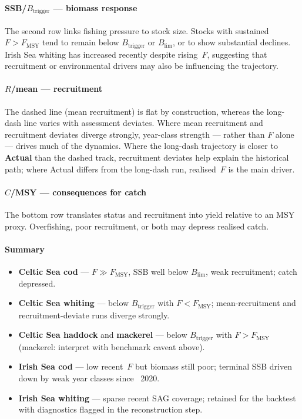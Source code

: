 \documentclass[11pt,a4paper]{extarticle}
\begin{document}
\paragraph{SSB/\(B_{\mathrm{trigger}}\) --- biomass response}
The second row links fishing pressure to stock size. Stocks with sustained
\(F > F_{\mathrm{MSY}}\) tend to remain below \(B_{\mathrm{trigger}}\) or
\(B_{\lim}\), or to show substantial declines. Irish Sea whiting has increased
recently despite rising~\(F\), suggesting that recruitment or environmental
drivers may also be influencing the trajectory.

\paragraph{\(R\)/mean --- recruitment}
The dashed line (mean recruitment) is flat by construction, whereas the long-dash line varies with assessment deviates. Where mean recruitment and recruitment deviates diverge strongly, year-class strength --- rather than \(F\) alone --- drives much of the dynamics. Where the long-dash trajectory is closer to \textbf{Actual} than the dashed track, recruitment deviates help explain the historical path; where Actual differs from the long-dash run,
realised~\(F\) is the main driver.

\paragraph{\(C\)/MSY --- consequences for catch}
The bottom row translates status and recruitment into yield relative to an MSY proxy. Overfishing, poor recruitment, or both may depress realised catch.

\paragraph{Summary}
\begin{itemize}
  \item \textbf{Celtic Sea cod} --- \(F \gg F_{\mathrm{MSY}}\), SSB well below
        \(B_{\lim}\), weak recruitment; catch depressed.
  \item \textbf{Celtic Sea whiting} --- below \(B_{\mathrm{trigger}}\) with
        \(F < F_{\mathrm{MSY}}\); mean-recruitment and recruitment-deviate
        runs diverge strongly.
  \item \textbf{Celtic Sea haddock} and \textbf{mackerel} --- below
        \(B_{\mathrm{trigger}}\) with \(F > F_{\mathrm{MSY}}\) (mackerel:
        interpret with benchmark caveat above).
  \item \textbf{Irish Sea cod} --- low recent~\(F\) but biomass still poor;
        terminal SSB driven down by weak year classes since ~2020.
  \item \textbf{Irish Sea whiting} --- sparse recent SAG coverage; retained for
        the backtest with diagnostics flagged in the reconstruction step.
\end{itemize}
\end{document}
